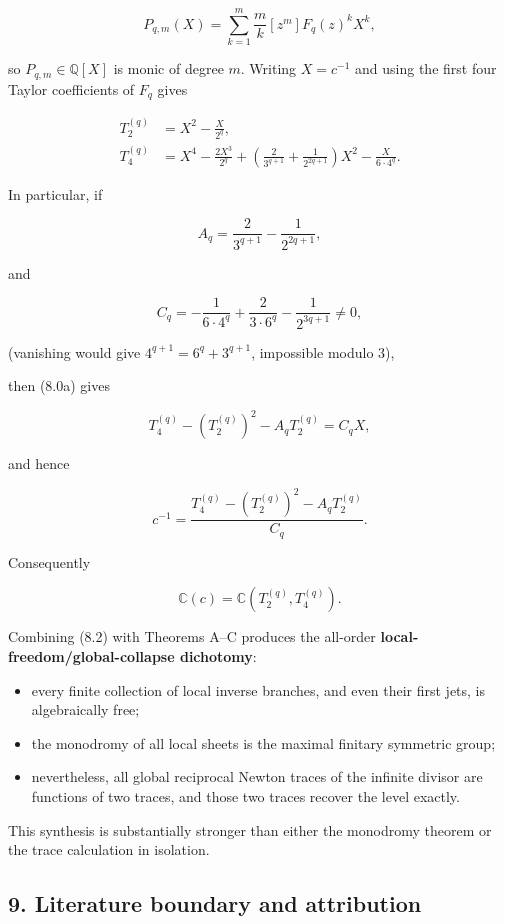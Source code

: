 \documentclass[11pt]{article}
\theoremstyle{keio}
\theoremstyle{definition}
\theoremstyle{remark}
\providecommand{\tightlist}{\setlength{\itemsep}{0pt}\setlength{\parskip}{0pt}}
\begin{document}
\[
 P_{q,m}(X)=\sum_{k=1}^m\frac{m}{k}[z^m]F_q(z)^kX^k,
\]

so \(P_{q,m}\in\mathbb Q[X]\) is monic of degree \(m\). Writing
\(X=c^{-1}\) and using the first four Taylor coefficients of \(F_q\) gives

\[
 \begin{aligned}
 T_2^{(q)}&=X^2-\frac{X}{2^q},\\
 T_4^{(q)}&=X^4-\frac{2X^3}{2^q}
 +\left(\frac2{3^{q+1}}+\frac1{2^{2q+1}}\right)X^2
 -\frac{X}{6\cdot4^q}.
 \end{aligned}
\tag{Inv-8.0a}
\]

In particular, if

\[
 A_q=\frac2{3^{q+1}}-\frac1{2^{2q+1}},
\]

and

\[
 C_q=-\frac1{6\cdot4^q}+\frac2{3\cdot6^q}
     -\frac1{2^{3q+1}}\ne0,
\]

(vanishing would give \(4^{q+1}=6^q+3^{q+1}\), impossible modulo \(3\)),

then (8.0a) gives

\[
 T_4^{(q)}-(T_2^{(q)})^2-A_qT_2^{(q)}=C_qX,
\]

and hence

\[
 c^{-1}=\frac{T_4^{(q)}-(T_2^{(q)})^2-A_qT_2^{(q)}}{C_q}.
\tag{Inv-8.1}
\]

Consequently

\[
 \mathbb C(c)=\mathbb C(T_2^{(q)},T_4^{(q)}).
\tag{Inv-8.2}
\]

Combining (8.2) with Theorems A--C produces the all-order
\textbf{local-freedom/global-collapse dichotomy}:

\begin{itemize}
\tightlist
\item
  every finite collection of local inverse branches, and even their first
  jets, is algebraically free;
\item
  the monodromy of all local sheets is the maximal finitary symmetric group;
\item
  nevertheless, all global reciprocal Newton traces of the infinite divisor
  are functions of two traces, and those two traces recover the level exactly.
\end{itemize}

This synthesis is substantially stronger than either the monodromy theorem or
the trace calculation in isolation.

\subsection{9. Literature boundary and attribution}
\end{document}
